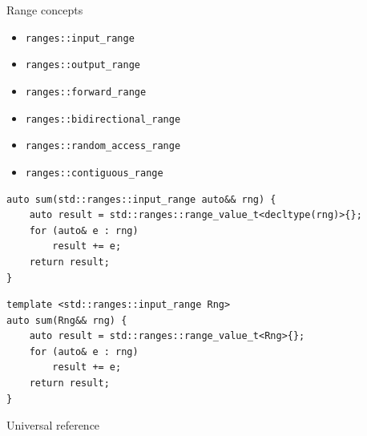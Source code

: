 \documentclass[aspectratio=169]{beamer}
\begin{document}
 \begin{frame}{Range concepts}
    \begin{itemize}
        \item \texttt{ranges::input_range}
        \item \texttt{ranges::output_range}
        \item \texttt{ranges::forward_range}
        \item \texttt{ranges::bidirectional_range}
        \item \texttt{ranges::random_access_range}
        \item \texttt{ranges::contiguous_range}
    \end{itemize}
\end{frame}

\begin{frame}[fragile,c]
\large
\begin{center}
\begin{verbatim}
auto sum(std::ranges::input_range auto&& rng) {
    auto result = std::ranges::range_value_t<decltype(rng)>{};
    for (auto& e : rng)
        result += e;
    return result;
}
\end{verbatim}
\end{center}
\let\thefootnote\relax{}
\end{frame}

\begin{frame}[fragile,c]
\large
\begin{center}
\begin{verbatim}
template <std::ranges::input_range Rng>
auto sum(Rng&& rng) {
    auto result = std::ranges::range_value_t<Rng>{};
    for (auto& e : rng)
        result += e;
    return result;
}
\end{verbatim}
\end{center}
\let\thefootnote\relax{}
\end{frame}

\begin{frame}[c]
    \Huge
    \begin{center}
        Universal reference
    \end{center}
\end{frame}

\end{document}
